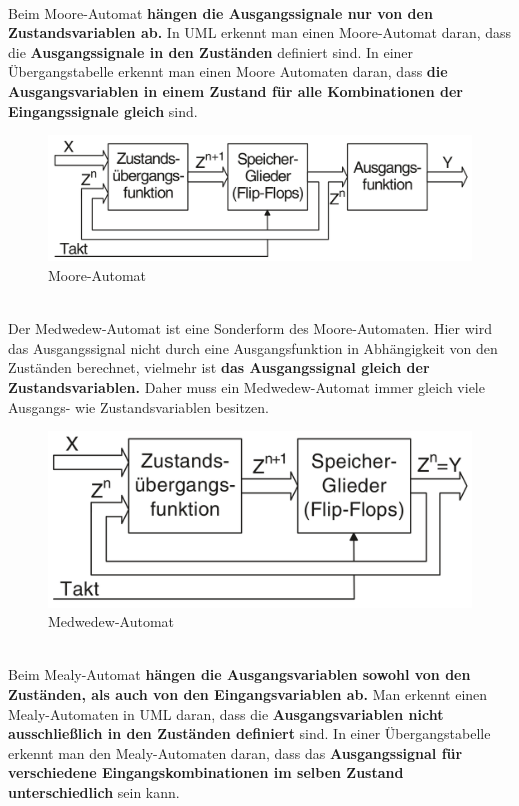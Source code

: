 \documentclass[a5paper,12pt,twoside]{scrartcl}
\begin{document}
\begin{minipage}{.48\linewidth}
  \\
  Beim Moore-Automat \textbf{hängen die Ausgangssignale nur von den Zustandsvariablen ab.} In UML erkennt man einen Moore-Automat daran, dass die \textbf{Ausgangssignale in den Zuständen} definiert sind. In einer Übergangstabelle erkennt man einen Moore Automaten daran, dass \textbf{die Ausgangsvariablen in einem Zustand für alle Kombinationen der Eingangssignale gleich} sind.
  \begin{figure}[H]
    \centering
    \includegraphics[width=\textwidth]{Moore_Automat}
    \caption{Moore-Automat}
  \end{figure}
\end{minipage}\hfill\vline\hfill%
\begin{minipage}{.48\linewidth}
  \\
  Der Medwedew-Automat ist eine Sonderform des Moore-Automaten. Hier wird das Ausgangssignal nicht durch eine Ausgangsfunktion in Abhängigkeit von den Zuständen berechnet, vielmehr ist \textbf{das Ausgangssignal gleich der Zustandsvariablen.} Daher muss ein Medwedew-Automat immer gleich viele Ausgangs- wie Zustandsvariablen besitzen.
  \begin{figure}[H]
    \centering
    \includegraphics[width=.78\textwidth]{Medwedew_Automat}
    \caption{Medwedew-Automat}
  \end{figure}
\end{minipage}

\\
Beim Mealy-Automat \textbf{hängen die Ausgangsvariablen sowohl von den Zuständen, als auch von den Eingangsvariablen ab.} Man erkennt einen Mealy-Automaten in UML daran, dass die \textbf{Ausgangsvariablen nicht ausschließlich in den Zuständen definiert} sind. In einer Übergangstabelle erkennt man den Mealy-Automaten daran, dass das \textbf{Ausgangssignal für verschiedene Eingangskombinationen im selben Zustand unterschiedlich} sein kann.
\end{document}
